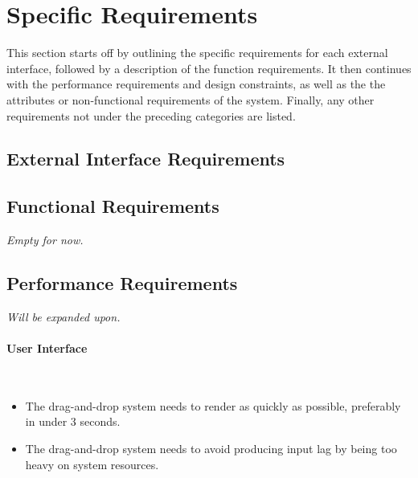\section{Specific Requirements}
	This section starts off by outlining the specific requirements for each external interface, followed by a description of the function requirements. It then continues with the performance requirements and design constraints, as well as the the attributes or non-functional requirements of the system. Finally, any other requirements not under the preceding categories are listed.
	\subsection{External Interface Requirements}
	
	\subsection{Functional Requirements}
	\textit{Empty for now.}
	
	\subsection{Performance Requirements}
	\textit{Will be expanded upon.}\\
	\paragraph{User Interface}\\
	\begin{itemize}
	    \item The drag-and-drop system needs to render as quickly as possible, preferably in under 3 seconds.\\
	    \item The drag-and-drop system needs to avoid producing input lag by being too heavy on system resources.\\
	\end{itemize}
		
